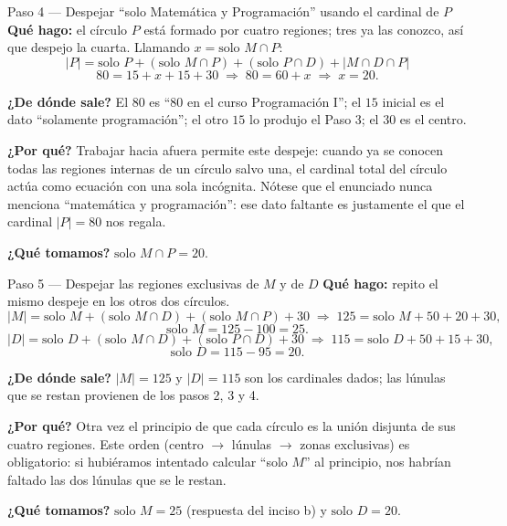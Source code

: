 \documentclass[11pt]{article}
\begin{document}
\begin{paso}{Paso 4 --- Despejar ``solo Matemática y Programación'' usando el cardinal de $P$}
\textbf{Qué hago:} el círculo $P$ está formado por cuatro regiones; tres ya las conozco, así que despejo
la cuarta. Llamando $x=\text{solo } M\cap P$:
\[
|P| = \text{solo }P + (\text{solo }M\cap P) + (\text{solo }P\cap D) + |M\cap D\cap P|
\]
\[
80 = 15 + x + 15 + 30 \;\Longrightarrow\; 80 = 60 + x \;\Longrightarrow\; x = 20 .
\]

\textbf{¿De dónde sale?} El $80$ es ``80 en el curso Programación I''; el $15$ inicial es el dato
``solamente programación''; el otro $15$ lo produjo el Paso 3; el $30$ es el centro.

\textbf{¿Por qué?} Trabajar hacia afuera permite este despeje: cuando ya se conocen todas las regiones
internas de un círculo salvo una, el cardinal total del círculo actúa como ecuación con una sola
incógnita. Nótese que el enunciado nunca menciona ``matemática y programación'': ese dato faltante es
justamente el que el cardinal $|P|=80$ nos regala.

\textbf{¿Qué tomamos?} $\text{solo } M\cap P = 20$.
\end{paso}

\begin{paso}{Paso 5 --- Despejar las regiones exclusivas de $M$ y de $D$}
\textbf{Qué hago:} repito el mismo despeje en los otros dos círculos.
\[
|M| = \text{solo }M + (\text{solo } M\cap D) + (\text{solo } M\cap P) + 30
\;\Longrightarrow\; 125 = \text{solo }M + 50 + 20 + 30,
\]
\[
\text{solo }M = 125 - 100 = 25 .
\]
\[
|D| = \text{solo }D + (\text{solo } M\cap D) + (\text{solo } P\cap D) + 30
\;\Longrightarrow\; 115 = \text{solo }D + 50 + 15 + 30,
\]
\[
\text{solo }D = 115 - 95 = 20 .
\]

\textbf{¿De dónde sale?} $|M|=125$ y $|D|=115$ son los cardinales dados; las lúnulas que se restan
provienen de los pasos 2, 3 y 4.

\textbf{¿Por qué?} Otra vez el principio de que cada círculo es la unión disjunta de sus cuatro regiones.
Este orden (centro $\to$ lúnulas $\to$ zonas exclusivas) es obligatorio: si hubiéramos intentado calcular
``solo $M$'' al principio, nos habrían faltado las dos lúnulas que se le restan.

\textbf{¿Qué tomamos?} $\text{solo }M = 25$ (respuesta del inciso b) y $\text{solo }D = 20$.
\end{paso}
\end{document}
